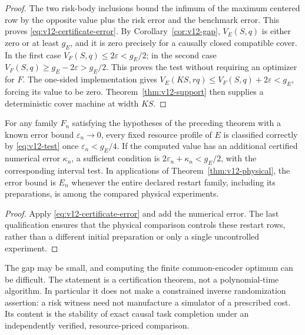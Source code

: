 \begin{proof}
The two risk-body inclusions bound the infimum of the maximum centered
row by the opposite value plus the risk error and the benchmark error.
This proves \eqref{eq:v12-certificate-error}. By
Corollary~\ref{cor:v12-gap}, $V_E(S,q)$ is either zero or at least $g_E$,
and it is zero precisely for a causally closed compatible cover. In the
first case $V_F(S,q)\le2\varepsilon<g_E/2$; in the second case
$V_F(S,q)\ge g_E-2\varepsilon>g_E/2$. This proves the test without
requiring an optimizer for $F$. The one-sided implementation gives
$V_E(KS,rq)\le V_F(S,q)+2\varepsilon<g_E$, forcing its value to be zero.
Theorem~\ref{thm:v12-support} then supplies a deterministic cover machine
at width $KS$.
\end{proof}

\begin{corollary}
\label{cor:v12-cert-sequence}
For any family $F_n$ satisfying the hypotheses of the preceding theorem
with a known error bound $\varepsilon_n\to0$, every fixed resource
profile of $E$ is classified correctly by \eqref{eq:v12-test} once
$\varepsilon_n<g_E/4$. If the computed value has an additional certified
numerical error $\kappa_n$, a sufficient condition is
$2\varepsilon_n+\kappa_n<g_E/2$, with the corresponding interval test.
In applications of Theorem~\ref{thm:v12-physical}, the error bound is
$E_n$ whenever the entire declared restart family, including its
preparations, is among the compared physical experiments.
\end{corollary}

\begin{proof}
Apply \eqref{eq:v12-certificate-error} and add the numerical error.
The last qualification ensures that the physical comparison controls
these restart rows, rather than a different initial preparation or only
a single uncontrolled experiment.
\end{proof}

The gap may be small, and computing the finite common-encoder optimum
can be difficult. The statement is a certification theorem, not a
polynomial-time algorithm. In particular it does not make a constrained
inverse randomization assertion: a risk witness need not manufacture a
simulator of a prescribed cost. Its content is the stability of exact
causal task completion under an independently verified, resource-priced
comparison.
